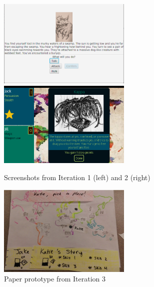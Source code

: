\documentclass[a4paper]{article}
\begin{document}
\newcommand{\figwidth}{2.5in}
\begin{figure}
\centering
\includegraphics[width=\figwidth]{iteration-1}
\includegraphics[width=\figwidth]{kappa-encounter}
\caption{Screenshots from Iteration 1 (left) and 2 (right)}
\label{fig:screenshots}
\end{figure}

\begin{figure}
\centering
\includegraphics[width=\figwidth]{paper-prototype}
\caption{Paper prototype from Iteration 3}
\label{fig:paper-prototype}
\end{figure}
\end{document}
